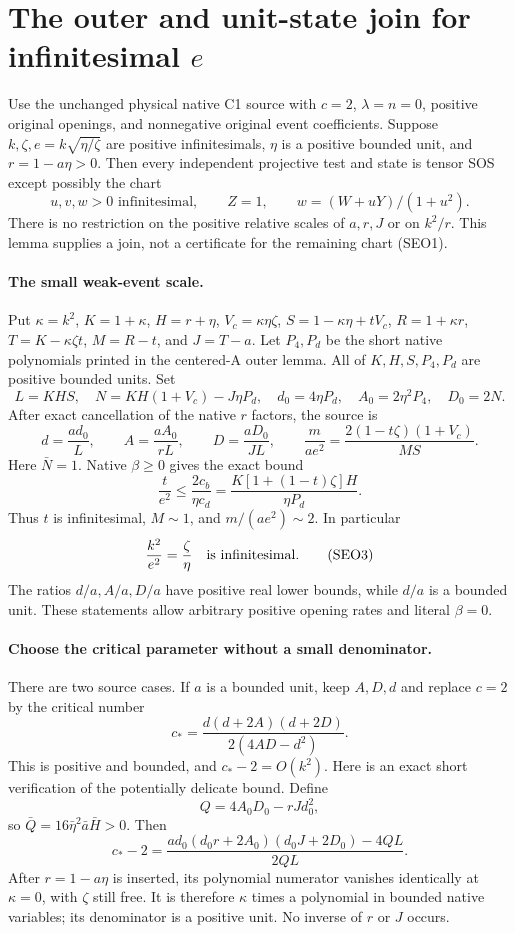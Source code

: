 \section[The outer and unit-state join for infinitesimal e]{The outer and unit-state join for infinitesimal $e$}
\label{sec:small-e-outer}

\begin{lemma}
Use the unchanged physical native C1 source with $c=2$,
$\lambda=n=0$, positive original openings, and nonnegative original
event coefficients. Suppose $k,\zeta,e=k\sqrt{\eta/\zeta}$ are positive
infinitesimals, $\eta$ is a positive bounded unit, and
$r=1-a\eta>0$. Then every independent projective test and state is
tensor SOS except possibly the chart
\[
 u,v,w>0\text{ infinitesimal},\qquad Z=1,
 \qquad w=(W+uY)/(1+u^2).
 \tag{SEO1}
\]
There is no restriction on the positive relative scales of $a,r,J$
or on $k^2/r$. This lemma supplies a join, not a certificate for the
remaining chart (SEO1).
\end{lemma}

\paragraph{The small weak-event scale.}
Put $\kappa=k^2$, $K=1+\kappa$, $H=r+\eta$,
$V_c=\kappa\eta\zeta$, $S=1-\kappa\eta+tV_c$,
$R=1+\kappa r$, $T=K-\kappa\zeta t$,
$M=R-t$, and $J=T-a$. Let $P_4,P_d$ be the short native
polynomials printed in the centered-A outer lemma. All of
$K,H,S,P_4,P_d$ are positive bounded units. Set
\[
 L=KHS,\quad N=KH(1+V_c)-J\eta P_d,\quad
 d_0=4\eta P_d,\quad A_0=2\eta^2P_4,\quad D_0=2N.
\]
After exact cancellation of the native $r$ factors, the source is
\[
 d=\frac{ad_0}{L},\qquad A=\frac{aA_0}{rL},\qquad
 D=\frac{aD_0}{JL},\qquad
 \frac{m}{ae^2}=
 \frac{2(1-t\zeta)(1+V_c)}{MS}.                 \tag{SEO2}
\]
Here $\bar N=1$. Native $\beta\ge0$ gives the exact bound
\[
 \frac{t}{e^2}\le\frac{2c_b}{\eta c_d}
 =\frac{K[1+(1-t)\zeta]H}{\eta P_d}.
\]
Thus $t$ is infinitesimal, $M\sim1$, and $m/(ae^2)\sim2$.
In particular
\[
 \frac{k^2}{e^2}=\frac\zeta\eta
 \quad\hbox{is infinitesimal}.                       \tag{SEO3}
\]
The ratios $d/a,A/a,D/a$ have positive real lower bounds, while
$d/a$ is a bounded unit. These statements allow arbitrary positive
opening rates and literal $\beta=0$.

\paragraph{Choose the critical parameter without a small denominator.}
There are two source cases. If $a$ is a bounded unit, keep $A,D,d$
and replace $c=2$ by the critical number
\[
 c_* =\frac{d(d+2A)(d+2D)}{2(4AD-d^2)}.
 \tag{SEO4}
\]
This is positive and bounded, and $c_*-2=O(k^2)$.
Here is an exact short verification of the potentially delicate bound.
Define
\[
 Q=4A_0D_0-rJd_0^2,
\]
so $\bar Q=16\bar\eta^2\bar a\bar H>0$. Then
\[
 c_*-2=
 \frac{ad_0(d_0r+2A_0)(d_0J+2D_0)-4QL}{2QL}.
 \tag{SEO5}
\]
After $r=1-a\eta$ is inserted, its polynomial numerator vanishes
identically at $\kappa=0$, with $\zeta$ still free. It is therefore
$\kappa$ times a polynomial in bounded native variables; its
denominator is a positive unit. No inverse of $r$ or $J$ occurs.


